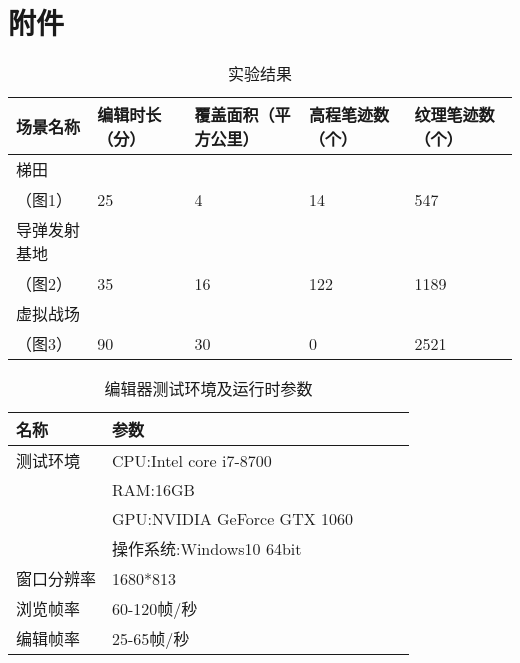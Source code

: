 
\chapter{附件}
\begin{table}[h]
\caption{实验结果}  
\begin{tabularx}{17cm}{lllll}  
\hline  
场景名称   & 编辑时长（分）  & 覆盖面积（平方公里） &高程笔迹数（个）&纹理笔迹数（个）\\
\hline
梯田\\（图1）     & 25 & 4  & 14 & 547            \\
\hline
导弹发射基地\\（图2） & 35 & 16  & 122 & 1189     \\
\hline
虚拟战场\\（图3）   & 90 & 30    & 0  & 2521     \\
\hline  
\end{tabularx}  
\end{table}

\begin{table}[h]
\caption{编辑器测试环境及运行时参数}  
\begin{tabularx}{17cm}{lllll}  
\hline  
名称&参数 \\
\hline
测试环境&CPU:Intel core i7-8700\\&RAM:16GB\\&GPU:NVIDIA GeForce GTX 1060            \\&操作系统:Windows10 64bit \\
\hline
窗口分辨率&   1680*813 \\
\hline
浏览帧率& 60-120帧/秒     \\
\hline  
编辑帧率&25-65帧/秒    \\
\hline

\end{tabularx}  
\end{table}


